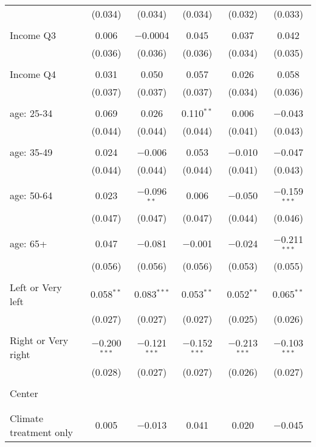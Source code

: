 \begin{tabular}{@{\extracolsep{5pt}}lccccc}
  & (0.034) & (0.034) & (0.034) & (0.032) & (0.033) \\ 
  & & & & & \\ 
 Income Q3 & 0.006 & $-$0.0004 & 0.045 & 0.037 & 0.042 \\ 
  & (0.036) & (0.036) & (0.036) & (0.034) & (0.035) \\ 
  & & & & & \\ 
 Income Q4 & 0.031 & 0.050 & 0.057 & 0.026 & 0.058 \\ 
  & (0.037) & (0.037) & (0.037) & (0.034) & (0.036) \\ 
  & & & & & \\ 
 age: 25-34 & 0.069 & 0.026 & 0.110$^{**}$ & 0.006 & $-$0.043 \\ 
  & (0.044) & (0.044) & (0.044) & (0.041) & (0.043) \\ 
  & & & & & \\ 
 age: 35-49 & 0.024 & $-$0.006 & 0.053 & $-$0.010 & $-$0.047 \\ 
  & (0.044) & (0.044) & (0.044) & (0.041) & (0.043) \\ 
  & & & & & \\ 
 age: 50-64 & 0.023 & $-$0.096$^{**}$ & 0.006 & $-$0.050 & $-$0.159$^{***}$ \\ 
  & (0.047) & (0.047) & (0.047) & (0.044) & (0.046) \\ 
  & & & & & \\ 
 age: 65+ & 0.047 & $-$0.081 & $-$0.001 & $-$0.024 & $-$0.211$^{***}$ \\ 
  & (0.056) & (0.056) & (0.056) & (0.053) & (0.055) \\ 
  & & & & & \\ 
 Left or Very left & 0.058$^{**}$ & 0.083$^{***}$ & 0.053$^{**}$ & 0.052$^{**}$ & 0.065$^{**}$ \\ 
  & (0.027) & (0.027) & (0.027) & (0.025) & (0.026) \\ 
  & & & & & \\ 
 Right or Very right & $-$0.200$^{***}$ & $-$0.121$^{***}$ & $-$0.152$^{***}$ & $-$0.213$^{***}$ & $-$0.103$^{***}$ \\ 
  & (0.028) & (0.027) & (0.027) & (0.026) & (0.027) \\ 
  & & & & & \\ 
 Center &  &  &  &  &  \\ 
  &  &  &  &  &  \\ 
  & & & & & \\ 
 Climate treatment only & 0.005 & $-$0.013 & 0.041 & 0.020 & $-$0.045 \\ 

\end{tabular}

